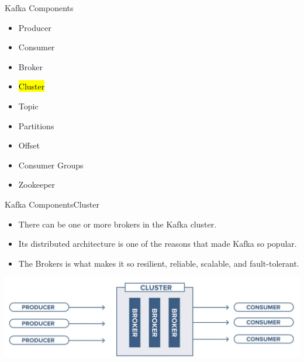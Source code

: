 \documentclass{beamer}
\begin{document}
\begin{frame}{Kafka Components}
  \begin{itemize}
    \item Producer
    \item Consumer
    \item Broker
    \item \hl{Cluster}
    \item Topic
    \item Partitions
    \item Offset
    \item Consumer Groups
    \item Zookeeper
  \end{itemize}
\end{frame}

\begin{frame}{Kafka Components}{Cluster}
  \begin{itemize}
    \item There can be one or more brokers in the Kafka cluster.
    \item Its distributed architecture is one of the reasons that made Kafka so popular.
    \item The Brokers is what makes it so resilient, reliable, scalable, and fault-tolerant.
  \end{itemize}
  \vspace*{1em}
  \includegraphics[width=1\textwidth]{fig/cluster.png}
\end{frame}
\end{document}
